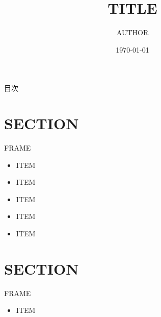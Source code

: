 \documentclass[dvipdfmx,aspectratio=169,t,14pt]{beamer}
\title{TITLE}
\date{\today}
\author{AUTHOR}
\institute{INSTITUTE}
\begin{document}
\maketitle

\begin{frame}{目次}
    \tableofcontents[hideallsubsections]
\end{frame}

\section{SECTION}

\begin{frame}{FRAME}
    \begin{itemize}
        \item ITEM
        \item ITEM
        \item ITEM
        \item ITEM
        \item ITEM
    \end{itemize}
\end{frame}

\section{SECTION}

\begin{frame}{FRAME}
    \begin{itemize}
        \item ITEM
    \end{itemize}
\end{frame}
\end{document}
